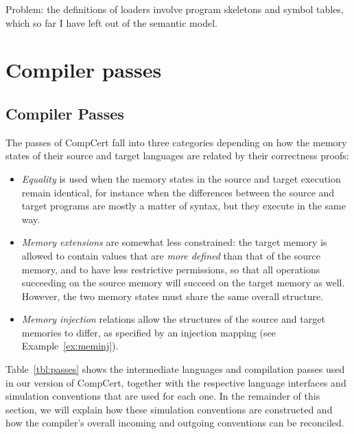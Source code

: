 \documentclass[sigplan,10pt,review,anonymous]{acmart}
\begin{document}
Problem: the definitions of loaders involve
program skeletons and symbol tables,
which so far I have left out of the semantic model.



\section{Compiler passes} \label{sec:corr} %

\subsection{Compiler Passes} %

The passes of CompCert fall into three categories
depending on how
the memory states of their source and target languages are related
by their correctness proofs:
\begin{itemize}
\item \emph{Equality} is used when the memory states
  in the source and target execution remain identical,
  for instance when the differences between
  the source and target programs are mostly a matter of syntax,
  but they execute in the same way.
\item \emph{Memory extensions} are somewhat less constrained:
  the target memory is allowed to contain values that are
  \emph{more defined} than that of the source memory,
  and to have less restrictive permissions,
  so that all operations succeeding on the source memory
  will succeed on the target memory as well.
  However,
  the two memory states must share the same overall structure.
\item \emph{Memory injection} relations
  allow the structures of the source and target memories
  to differ, as specified by an injection mapping
  (see Example~\ref{ex:meminj}).
\end{itemize}

Table~\ref{tbl:passes} shows
the intermediate languages and compilation passes
used in our version of CompCert,
together with the respective
language interfaces and
simulation conventions
that are used for each one.
In the remainder of this section,
we will explain how these simulation conventions are constructed
and how the compiler's overall incoming and outgoing conventions
can be reconciled.
\end{document}

